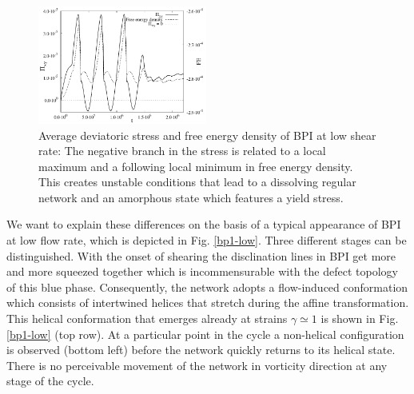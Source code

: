 \documentclass[aps,pre,reprint,superscriptaddress, twocolumn]{revtex4}
\begin{document}
\begin{figure}[htpb]
\includegraphics[width=0.495\textwidth]{stress_fe_yield_bp1.pdf}
\caption{Average deviatoric stress and free energy density of BPI at low shear rate: The negative branch in the stress is related to a local maximum and a following local minimum in free energy density. This creates unstable conditions that lead to a dissolving regular network and an amorphous state which features a yield stress.}
\label{bp1-fe-yield}
\end{figure}

We want to explain these differences on the basis of a typical 
appearance of BPI at low flow rate, which is depicted in Fig. \ref{bp1-low}.
Three different stages can be distinguished. 
With the onset of shearing the disclination lines 
in BPI get more and more squeezed together which is incommensurable with 
the defect topology of this blue phase. 
Consequently, the network adopts a flow-induced conformation which consists 
of intertwined helices that stretch during the affine transformation.
This helical conformation that emerges already at strains $\gamma\simeq1$ 
is shown in Fig. \ref{bp1-low} (top row).
At a particular point in the cycle a non-helical configuration is
observed (bottom left) before the network quickly returns
to its helical state.
There is no perceivable movement of the network in vorticity 
direction at any stage of the cycle.
\end{document}
